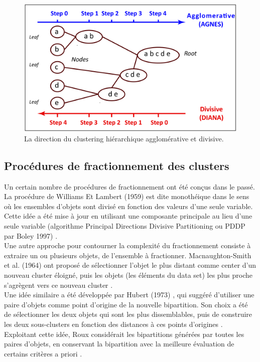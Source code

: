 \begin{figure}[H]
	\begin{center}
		\includegraphics[scale=0.15]{images/chapitre6/hierarchical_agglo_divisive.png}
	\end{center}
\caption{La direction du clustering hiérarchique agglomérative et divisive.}
\label{hierarchical_agglo_divisive_illust}
\end{figure}

\subsection{Procédures de fractionnement des clusters}
Un certain nombre de procédures de fractionnement ont été conçus dans le passé. La procédure de Williams Et Lambert (1959) \cite{williams1959multivariate} est dite monothéique dans le sens où les ensembles d’objets sont divisé en fonction des valeurs d’une seule variable. Cette idée a été mise à jour en utilisant une composante principale au lieu d’une seule variable (algorithme Principal Directions Divisive Partitioning ou PDDP par Boley 1997) \cite{roux2018comparative}. \\
Une autre approche pour contourner la complexité du fractionnement consiste à extraire un ou plusieurs objets, de l’ensemble à fractionner. Macnaughton-Smith et al. (1964) \cite{macnaughton1964dissimilarity} ont proposé de sélectionner l’objet le plus distant comme center d’un nouveau cluster éloigné, puis les objets (les éléments du data set) les plus proche s’agrègent vers ce nouveau cluster \cite{roux2018comparative}. \\
Une idée similaire a été développée par Hubert (1973) \cite{hubert1973monotone}, qui suggéré d’utiliser une paire d’objets comme point d’origine de la nouvelle bipartition. Son choix a été de sélectionner les deux objets qui sont les plus dissemblables, puis de construire les deux sous-clusters en fonction des distances à ces points d’origines \cite{roux2018comparative}. \\
Exploitant cette idée, Roux \cite{roux1991basic} \cite{roux1995divisive} considérait les bipartitions générées par toutes les paires d'objets, en conservant la bipartition avec la meilleure évaluation de certains critères a priori \cite{roux2018comparative}. \\

